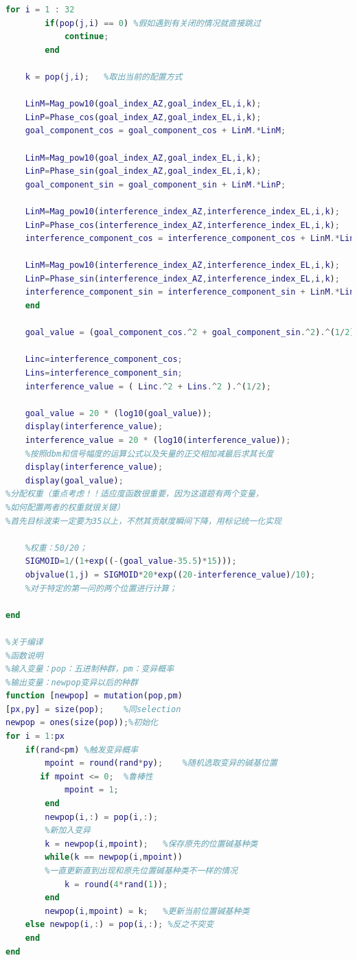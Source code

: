 \documentclass[UTF8,12pt]{ctexart}
\begin{document}
\begin{appendices}
\begin{scriptsize}
\begin{lstlisting}[language=Matlab]
    for i = 1 : 32
        if(pop(j,i) == 0) %假如遇到有关闭的情况就直接跳过
            continue;
        end
    
    k = pop(j,i);   %取出当前的配置方式

    LinM=Mag_pow10(goal_index_AZ,goal_index_EL,i,k);
    LinP=Phase_cos(goal_index_AZ,goal_index_EL,i,k);
    goal_component_cos = goal_component_cos + LinM.*LinM;

    LinM=Mag_pow10(goal_index_AZ,goal_index_EL,i,k);
    LinP=Phase_sin(goal_index_AZ,goal_index_EL,i,k);
    goal_component_sin = goal_component_sin + LinM.*LinP;

    LinM=Mag_pow10(interference_index_AZ,interference_index_EL,i,k);
    LinP=Phase_cos(interference_index_AZ,interference_index_EL,i,k);
    interference_component_cos = interference_component_cos + LinM.*LinP;

    LinM=Mag_pow10(interference_index_AZ,interference_index_EL,i,k);
    LinP=Phase_sin(interference_index_AZ,interference_index_EL,i,k);
    interference_component_sin = interference_component_sin + LinM.*LinP;
    end

    goal_value = (goal_component_cos.^2 + goal_component_sin.^2).^(1/2);

    Linc=interference_component_cos;
    Lins=interference_component_sin;
    interference_value = ( Linc.^2 + Lins.^2 ).^(1/2);
    
    goal_value = 20 * (log10(goal_value));
    display(interference_value);
    interference_value = 20 * (log10(interference_value)); 
    %按照dbm和信号幅度的运算公式以及矢量的正交相加减最后求其长度
    display(interference_value);
    display(goal_value);
%分配权重（重点考虑！！适应度函数很重要，因为这道题有两个变量，
%如何配置两者的权重就很关键）
%首先目标波束一定要为35以上，不然其贡献度瞬间下降，用标记统一化实现

    %权重：50/20；
    SIGMOID=1/(1+exp((-(goal_value-35.5)*15)));
    objvalue(1,j) = SIGMOID*20*exp((20-interference_value)/10);
    %对于特定的第一问的两个位置进行计算；

end

%关于编译
%函数说明
%输入变量：pop：五进制种群，pm：变异概率
%输出变量：newpop变异以后的种群
function [newpop] = mutation(pop,pm)
[px,py] = size(pop);    %同selection
newpop = ones(size(pop));%初始化
for i = 1:px
    if(rand<pm) %触发变异概率
        mpoint = round(rand*py);    %随机选取变异的碱基位置
       if mpoint <= 0;  %鲁棒性
            mpoint = 1;
        end
        newpop(i,:) = pop(i,:);
        %新加入变异
        k = newpop(i,mpoint);   %保存原先的位置碱基种类
        while(k == newpop(i,mpoint))    
        %一直更新直到出现和原先位置碱基种类不一样的情况
            k = round(4*rand(1));
        end
        newpop(i,mpoint) = k;   %更新当前位置碱基种类
    else newpop(i,:) = pop(i,:); %反之不突变
    end
end


\end{lstlisting}
\end{scriptsize}
\end{appendices}
\end{document}

